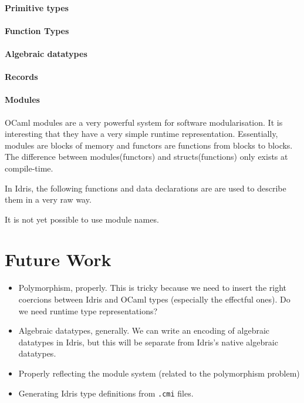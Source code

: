\documentclass[a4paper,11pt,twocolumn]{article}
\begin{document}
\paragraph{Primitive types}



\paragraph{Function Types}

\paragraph{Algebraic datatypes}

\paragraph{Records}

\paragraph{Modules}
OCaml modules are a very powerful system for software modularisation. 
It is interesting that they have a very simple runtime representation.
Essentially,  modules are blocks of memory and functors are functions
from blocks to blocks. The difference between modules(functors) and
structs(functions) only exists at compile-time.

In Idris, the following functions and data declarations are are used to 
describe them in a very raw way.

It is not yet possible to use module names.



\section{Future Work}

\begin{itemize}
\item Polymorphism, properly. This is tricky because we need to insert
  the right coercions between Idris and OCaml types (especially the
  effectful ones). Do we need runtime type representations?
\item Algebraic datatypes, generally. We can write an encoding of
  algebraic datatypes in Idris, but this will be separate from Idris's
  native algebraic datatypes.
\item Properly reflecting the module system (related to the
  polymorphism problem)
\item Generating Idris type definitions from \texttt{.cmi} files.
\end{itemize}
\end{document}
